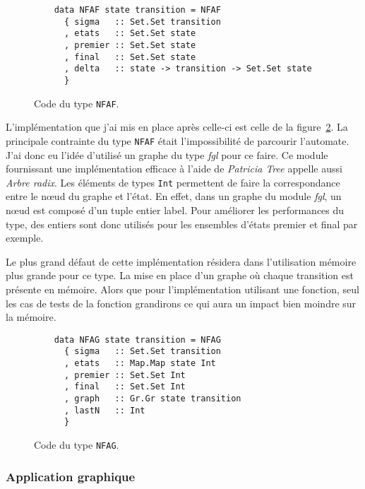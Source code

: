 \begin{figure}[H]
  \begin{verbatim}
    data NFAF state transition = NFAF
      { sigma   :: Set.Set transition
      , etats   :: Set.Set state
      , premier :: Set.Set state
      , final   :: Set.Set state
      , delta   :: state -> transition -> Set.Set state
      }
  \end{verbatim}
  \caption{Code du type \texttt{NFAF}.}\label{fig:codeNFAF}
\end{figure}

\vphantom{}

L'implémentation que j'ai mis en place après celle-ci est celle de la 
figure~\ref{fig:codeNFAG}. La principale contrainte du type 
\texttt{NFAF} était l'impossibilité de parcourir l'automate. J'ai 
donc eu l'idée d'utilisé un graphe du type \textit{fgl} pour ce faire. Ce module
fournissant une implémentation efficace à l'aide de \textit{Patricia Tree} 
appelle aussi \textit{Arbre radix}. Les éléments de types 
\texttt{Int} permettent de faire la correspondance entre le n\oe ud
du graphe et l'état. En effet, dans un graphe du module \textit{fgl}, un n\oe ud
est composé d'un tuple entier label. Pour améliorer les performances du type, 
des entiers sont donc utilisés pour les ensembles d'états premier et final par 
exemple. 

\vphantom{}

Le plus grand défaut de cette implémentation résidera dans l'utilisation 
mémoire plus grande pour ce type. La mise en place d'un graphe où chaque 
transition est présente en mémoire. Alors que pour l'implémentation utilisant 
une fonction, seul les cas de tests de la fonction grandirons ce qui aura un 
impact bien moindre sur la mémoire.

\begin{figure}[H]
  \begin{verbatim}
    data NFAG state transition = NFAG
      { sigma   :: Set.Set transition
      , etats   :: Map.Map state Int
      , premier :: Set.Set Int
      , final   :: Set.Set Int
      , graph   :: Gr.Gr state transition
      , lastN   :: Int
      }
  \end{verbatim}
  \caption{Code du type \texttt{NFAG}.}\label{fig:codeNFAG}
\end{figure}

\subsubsection{Application graphique}

